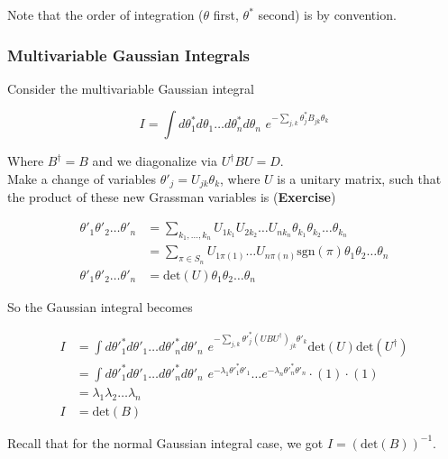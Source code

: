 \noindent Note that the order of integration ($\theta$ first, $\theta^*$ second) is by convention.

\subsubsection*{Multivariable Gaussian Integrals}

\noindent Consider the multivariable Gaussian integral

\begin{equation}
I = \int d\theta_1^* d\theta_1 \dots d\theta_n^* d\theta_n \,\, e^{-\sum_{j,k} \theta^*_j B_{jk} \theta_k}
\end{equation}

\noindent Where $B^\dagger = B$ and we diagonalize via $U^\dagger B U = D$. \\

\noindent Make a change of variables $\theta'_j = U_{jk} \theta_k$, where $U$ is a unitary matrix, such that the product of these new Grassman variables is (\textbf{Exercise})

\begin{align}
\theta'_1 \theta'_2 \dots \theta'_n &= \sum_{k_1, \dots, k_n} U_{1 k_1} U_{2 k_2} \dots U_{n k_n} \theta_{k_1} \theta_{k_2} \dots \theta_{k_n} \\
&= \sum_{\pi \in S_n} U_{1 \pi(1)} \dots U_{n \pi(n)} \text{sgn}(\pi) \theta_1 \theta_2 \dots \theta_n \\
\theta'_1 \theta'_2 \dots \theta'_n &= \text{det} (U) \theta_1 \theta_2 \dots \theta_n
\end{align}

\noindent So the Gaussian integral becomes

\begin{align}
I &= \int d{\theta'}_1^* d\theta'_1 \dots d{\theta'}_n^* d\theta'_n \,\, e^{-\sum_{j,k} {\theta'}^*_j (U B U^\dagger )_{jk} \theta'_k} \text{det}(U) \text{det}(U^\dagger) \\
&= \int d{\theta'}_1^* d\theta'_1 \dots d{\theta'}_n^* d\theta'_n \,\, e^{-\lambda_1 {\theta'}_1^* \theta'_1} \dots e^{-\lambda_n {\theta'}_n^* \theta'_n} \cdot (1) \cdot (1) \\
&= \lambda_1 \lambda_2 \dots \lambda_n \\
I &= \text{det} (B)
\end{align}

\noindent Recall that for the normal Gaussian integral case, we got $I = (\text{det}(B))^{-1}$. \\

